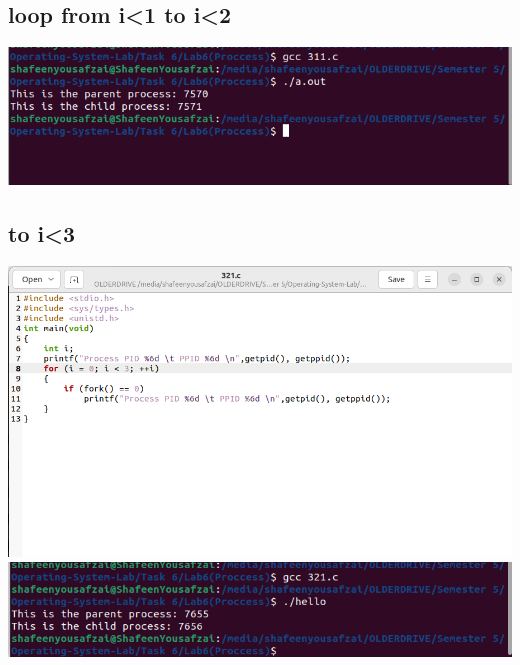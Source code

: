 \documentclass[12pt]{article}
\begin{document}
\subsection{loop from i<1 to i<2}
 \includegraphics[width=\textwidth]{Screenshot from 2024-09-27 05-37-44.png}
\subsection{to i<3}
 \includegraphics[width=\textwidth]{Screenshot from 2024-09-27 05-37-58.png}
    \\
  \includegraphics[width=\textwidth]{Screenshot from 2024-09-27 05-38-17.png}
\end{document}
